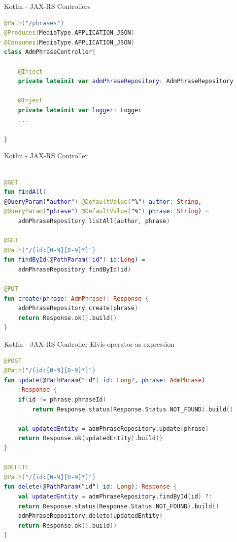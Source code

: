 \documentclass[aspectratio=169]{beamer}
\begin{document}
\begin{frame}[fragile]{Kotlin - JAX-RS Controllers}
\begin{lstlisting}[language=Kotlin, basicstyle=\scriptsize]
@Path("/phrases")
@Produces(MediaType.APPLICATION_JSON)
@Consumes(MediaType.APPLICATION_JSON)
class AdmPhraseController{

	@Inject
	private lateinit var admPhraseRepository: AdmPhraseRepository
	
	@Inject
	private lateinit var logger: Logger
	...

}
\end{lstlisting}
\end{frame}

\begin{frame}[fragile]{Kotlin - JAX-RS Controller}
\begin{lstlisting}[language=Kotlin, basicstyle=\scriptsize]

@GET
fun findAll(
@QueryParam("author") @DefaultValue("%") author: String,
@QueryParam("phrase") @DefaultValue("%") phrase: String) =
	admPhraseRepository.listAll(author, phrase)

@GET
@Path("/{id:[0-9][0-9]*}")
fun findById(@PathParam("id") id:Long) =
	admPhraseRepository.findById(id)

@PUT
fun create(phrase: AdmPhrase): Response {
	admPhraseRepository.create(phrase)
	return Response.ok().build()
}
\end{lstlisting}
\end{frame}


\begin{frame}[fragile]{Kotlin - JAX-RS Controller}
Elvis operator as expression
\begin{lstlisting}[language=Kotlin, basicstyle=\scriptsize]
@POST
@Path("/{id:[0-9][0-9]*}")
fun update(@PathParam("id") id: Long?, phrase: AdmPhrase)
	:Response {
	if(id != phrase.phraseId) 
		return Response.status(Response.Status.NOT_FOUND).build()
	
	val updatedEntity = admPhraseRepository.update(phrase)
	return Response.ok(updatedEntity).build()
}

@DELETE
@Path("/{id:[0-9][0-9]*}")
fun delete(@PathParam("id") id: Long): Response {
	val updatedEntity = admPhraseRepository.findById(id) ?:
	return Response.status(Response.Status.NOT_FOUND).build()
	admPhraseRepository.delete(updatedEntity)
	return Response.ok().build()
}
\end{lstlisting}

\end{frame}
\end{document}

